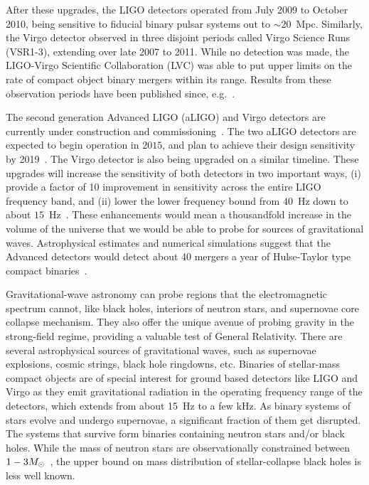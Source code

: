 After these upgrades, the LIGO detectors operated from July 2009
to October 2010, being sensitive to fiducial binary pulsar systems out to 
$\sim 20$~Mpc. 
Similarly, the Virgo detector observed in three disjoint periods called Virgo 
Science Runs (VSR1-3), extending over late 2007 to 2011.
While no detection was made, the LIGO-Virgo Scientific Collaboration
(LVC) was able to put upper limits on the rate of compact object binary mergers
within its range. Results from these observation periods have been published 
since, e.g.~\cite{Messaritaki:2005wv,Abadie:2010mt,Abadie:2012rq,Abbott:2009km,
Colaboration:2011nz,Abadie:2010yb,Abbott:2009qj,Abbott:2009tt,Abadie:2011kd,
Aasi:2012rja,Abbott:2003yq,Abbott:2005pu,Sintes:2005fp,Abadie:2011md,
Palomba:2012wn}. 

The second generation Advanced LIGO (aLIGO) and Virgo detectors are currently
under construction and commissioning~\cite{Harry:2010zz,aVIRGO}.
The two aLIGO detectors are expected to begin operation in $2015$, and
plan to achieve their design sensitivity by 2019~\cite{Aasi:2013wya}. 
The Virgo detector is also being upgraded on a similar timeline. 
These upgrades will increase the sensitivity of both detectors in two 
important ways, (i) provide a factor of 10 improvement in sensitivity 
across the entire LIGO frequency band, and (ii) lower the lower frequency
bound from $40$~Hz down to about $15$~Hz~\cite{Harry:2010zz}. 
These enhancements would mean a thousandfold increase in the volume of the
universe that we would be able to probe for sources of gravitational waves. 
Astrophysical estimates and numerical simulations suggest that the Advanced
detectors would detect about 40 mergers a year of Hulse-Taylor type compact
binaries~\cite{LSCCBCRates2010}. 


Gravitational-wave astronomy can probe regions that the electromagnetic
spectrum cannot, like black holes, interiors of neutron stars, and 
supernovae core collapse mechanism.
They also offer the unique avenue of probing gravity in 
the strong-field regime, providing a valuable test of General Relativity.
There are several astrophysical sources of gravitational waves, such as 
supernovae explosions, cosmic strings, black hole ringdowns, etc. 
Binaries of stellar-mass compact objects are of special interest for 
ground based detectors like LIGO and Virgo as they emit gravitational 
radiation in the operating frequency range of the detectors, which
extends from about 15~Hz to a few kHz. As binary systems of 
stars evolve and undergo supernovae, a significant 
fraction of them get disrupted. The systems that survive form binaries
containing neutron stars and/or black holes. While the mass of neutron
stars are observationally constrained between 
$1-3M_\odot$~\cite{2013ApJ...778...66K,Freire:2011}, the upper bound on 
mass distribution of stellar-collapse black holes is less well known. 

